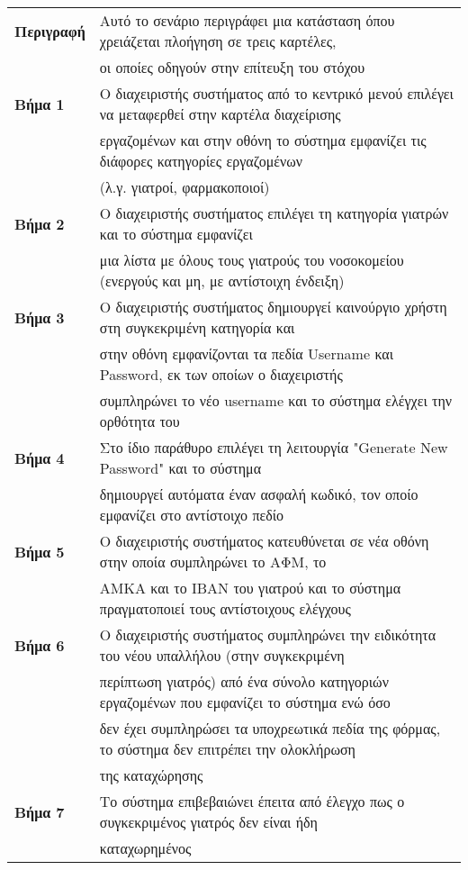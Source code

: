\documentclass{article}
\newcommand\T{\rule{0pt}{2.6ex}}       %
\newcommand\B{\rule[-1.2ex]{0pt}{0pt}}
\begin{document}
 \begin{center}
     \begin{tabular}{|l|l|}
     \hline
      \textbf{Περιγραφή} & Αυτό το σενάριο περιγράφει μια κατάσταση όπου χρειάζεται πλοήγηση σε τρεις καρτέλες, \T \\& οι οποίες οδηγούν στην επίτευξη του στόχου \B \\ 
      \hline
      \textbf{Βήμα 1} & Ο διαχειριστής συστήματος από το κεντρικό μενού επιλέγει να μεταφερθεί στην  καρτέλα διαχείρισης \T \\& εργαζομένων και στην οθόνη το σύστημα εμφανίζει τις διάφορες κατηγορίες εργαζομένων \\& (λ.γ. γιατροί, φαρμακοποιοί) \B \\
      \hline
      \textbf{Βήμα 2} & Ο διαχειριστής συστήματος επιλέγει τη κατηγορία γιατρών και το σύστημα εμφανίζει\T \\& μια λίστα με όλους τους γιατρούς του νοσοκομείου  (ενεργούς και μη, με αντίστοιχη ένδειξη) \B \\
      \hline
      \textbf{Βήμα 3} & Ο διαχειριστής συστήματος δημιουργεί καινούργιο χρήστη στη συγκεκριμένη κατηγορία και \T \\& στην οθόνη εμφανίζονται τα πεδία Username και Password, εκ των οποίων ο διαχειριστής \\& συμπληρώνει το νέο username και το σύστημα ελέγχει την ορθότητα του \B \\
      \hline
      \textbf{Βήμα 4} & Στο ίδιο παράθυρο επιλέγει τη λειτουργία "Generate New Password" και το σύστημα \T \\& δημιουργεί αυτόματα έναν ασφαλή κωδικό, τον οποίο εμφανίζει στο αντίστοιχο πεδίο\B \\
      \hline
       \textbf{Βήμα 5} & Ο διαχειριστής συστήματος κατευθύνεται σε νέα οθόνη στην οποία συμπληρώνει  το ΑΦΜ, το \T \\& ΑΜΚΑ και το IBAN του γιατρού και το σύστημα πραγματοποιεί τους αντίστοιχους ελέγχους \B \\
      \hline
      \textbf{Βήμα 6} & Ο διαχειριστής συστήματος συμπληρώνει την ειδικότητα του νέου υπαλλήλου (στην συγκεκριμένη \T \\& περίπτωση γιατρός)  από ένα σύνολο κατηγοριών εργαζομένων που εμφανίζει το σύστημα ενώ όσο \\& δεν έχει συμπληρώσει τα υποχρεωτικά πεδία της φόρμας, το σύστημα δεν επιτρέπει την ολοκλήρωση \\& της καταχώρησης \B \\
      \hline
      \textbf{Βήμα 7} & Το σύστημα επιβεβαιώνει έπειτα από έλεγχο πως ο συγκεκριμένος γιατρός δεν είναι ήδη \T \\& καταχωρημένος \B \\

\end{tabular}
\end{center}
\end{document}
